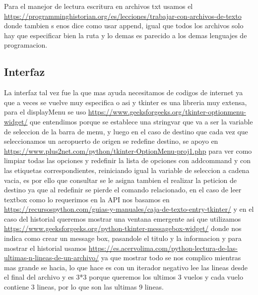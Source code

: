 \documentclass[12pt]{article}
\begin{document}
Para el manejor de lectura escritura en archivos txt usamos el \url{https://programminghistorian.org/es/lecciones/trabajar-con-archivos-de-texto} donde tambien s enos dice como usar append, igual que todos los archivos solo hay que especificar bien la ruta y lo demas es parecido a los demas lenguajes de programacion.

\subsection{Interfaz}
La interfaz tal vez fue la que mas ayuda necesitamos de codigos de internet ya que a veces se vuelve muy especifica o asi y tkinter es una libreria muy extensa, para el displayMenu se uso \url{https://www.geeksforgeeks.org/tkinter-optionmenu-widget/} que entendimos porque se establece una stringvar que va a ser la variable de seleccion de la barra de menu, y luego en el caso de destino que cada vez que seleccionamos un aeropuerto de origen se redefine destino, se apoyo en \url{https://www.plus2net.com/python/tkinter-OptionMenu-proj1.php} para ver como limpiar todas las opciones y redefinir la lista de opciones con addcommand y con las etiquetas correspondientes, reiniciando igual la variable de seleccion a cadena vacia, es por ello que consultar se le asigna tambien el realizar la peticion de destino ya que al redefinir se pierde el comando relacionado, en el caso de leer textbox como lo requerimos en la API nos basamos en \url{https://recursospython.com/guias-y-manuales/caja-de-texto-entry-tkinter/} y en el caso del historial queremos mostrar una ventana emergente asi que utilizamos \url{https://www.geeksforgeeks.org/python-tkinter-messagebox-widget/} donde nos indica como crear un message box, pasandole el titulo y la informacion y para mostrar el historial usamos \url{https://es.acervolima.com/python-lectura-de-las-ultimas-n-lineas-de-un-archivo/} ya que mostrar todo se nos complico mientras mas grande se hacia, lo que hace es con un iterador negativo lee las lineas desde el final del archivo y es 3*3 porque queremos los ultimos 3 vuelos y cada vuelo contiene 3 lineas, por lo que son las ultimas 9 lineas.
\end{document}
